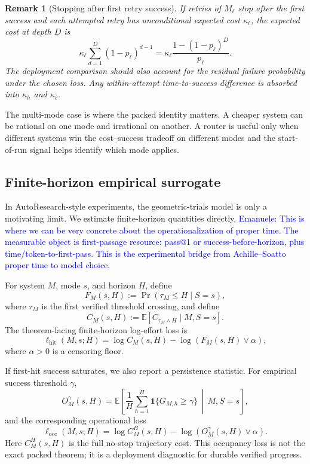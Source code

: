 \documentclass{article}
\newtheorem{remark}{Remark}
\newcommand{\E}{\mathbb{E}}
\newcommand{\one}{\mathbf{1}}
\begin{document}
\begin{remark}[Stopping after first retry success]
If retries of \(M_\ell\) stop after the first success and each attempted retry has
unconditional expected cost \(\kappa_\ell\), the expected cost at depth \(D\) is
\[
    \kappa_\ell
    \sum_{d=1}^{D}(1-p_\ell)^{d-1}
    =
    \kappa_\ell\frac{1-(1-p_\ell)^D}{p_\ell}.
\]
The deployment comparison should also account for the residual failure probability under
the chosen loss.  Any within-attempt time-to-success difference is absorbed into
\(\kappa_h\) and \(\kappa_\ell\).
\end{remark}

The multi-mode case is where the packed identity matters.  A cheaper system can be
rational on one mode and irrational on another.  A router is useful only when different
systems win the cost--success tradeoff on different modes and the start-of-run signal helps
identify which mode applies.



\subsection{Finite-horizon empirical surrogate}

In AutoResearch-style experiments, the geometric-trials model is only a motivating limit.
We estimate finite-horizon quantities directly.
\textcolor{blue}{Emanuele: This is where we can be very concrete about the operationalization of proper time. The measurable object is first-passage resource: pass@1 or success-before-horizon, plus time/token-to-first-pass. This is the experimental bridge from Achille--Soatto proper time to model choice.}

For system \(M\), mode \(s\), and horizon \(H\), define
\[
    F_M(s,H):=\Pr(\tau_M\le H\mid S=s),
\]
where \(\tau_M\) is the first verified threshold crossing, and define
\[
    C_M(s,H):=\E[C_{\tau_M\wedge H}\mid M,S=s].
\]
The theorem-facing finite-horizon log-effort loss is
\[
    \ell_{\mathrm{hit}}(M,s;H)
    =
    \log C_M(s,H)-\log(F_M(s,H)\vee\alpha),
\]
where \(\alpha>0\) is a censoring floor.

If first-hit success saturates, we also report a persistence statistic.  For empirical
success threshold \(\gamma\),
\[
    O_M^\gamma(s,H)
    =
    \E\left[
        \frac1H\sum_{h=1}^H
        \one\{G_{M,h}\ge\gamma\}
        \,\middle|\,
        M,S=s
    \right],
\]
and the corresponding operational loss
\[
    \ell_{\mathrm{occ}}(M,s;H)
    =
    \log C_M^H(s,H)-\log(O_M^\gamma(s,H)\vee\alpha).
\]
Here \(C_M^H(s,H)\) is the full no-stop trajectory cost.
This occupancy loss is not the exact packed theorem; it is a deployment diagnostic for
durable verified progress.
\end{document}
